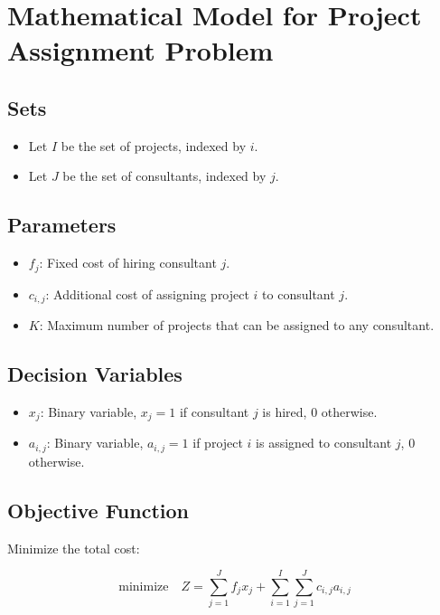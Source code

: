 \documentclass{article}
\begin{document}
\section*{Mathematical Model for Project Assignment Problem}

\subsection*{Sets}
\begin{itemize}
    \item Let \( I \) be the set of projects, indexed by \( i \).
    \item Let \( J \) be the set of consultants, indexed by \( j \).
\end{itemize}

\subsection*{Parameters}
\begin{itemize}
    \item \( f_j \): Fixed cost of hiring consultant \( j \).
    \item \( c_{i,j} \): Additional cost of assigning project \( i \) to consultant \( j \).
    \item \( K \): Maximum number of projects that can be assigned to any consultant.
\end{itemize}

\subsection*{Decision Variables}
\begin{itemize}
    \item \( x_{j} \): Binary variable, \( x_{j} = 1 \) if consultant \( j \) is hired, \( 0 \) otherwise.
    \item \( a_{i,j} \): Binary variable, \( a_{i,j} = 1 \) if project \( i \) is assigned to consultant \( j \), \( 0 \) otherwise.
\end{itemize}

\subsection*{Objective Function}
Minimize the total cost:

\[
\text{minimize} \quad Z = \sum_{j=1}^{J} f_j x_j + \sum_{i=1}^{I} \sum_{j=1}^{J} c_{i,j} a_{i,j}
\]
\end{document}
